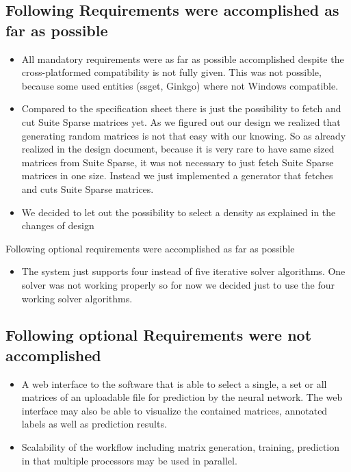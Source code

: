 \documentclass[parskip=full]{scrartcl}
\begin{document}
\subsection{Following Requirements were accomplished as far as possible}
\begin{itemize}

\item All mandatory requirements were as far as possible accomplished despite the cross-platformed compatibility is not fully given. 
This was not possible, because some used entities (\gls{ssget}, \gls{Ginkgo}) where not \gls{Windows} compatible.

\item Compared to the specification sheet there is just the possibility to fetch and cut \gls{Suite Sparse} matrices yet.
As we figured out our design we realized that generating random matrices is not that easy with our knowing.
So as already realized in the design document, because it is very rare to have same sized matrices from \gls{Suite Sparse}, it was not necessary to just fetch \gls{Suite Sparse} matrices in one size. 
Instead we just implemented a generator that fetches and cuts \gls{Suite Sparse} matrices.

\item We decided to let out the possibility to select a density as explained in the changes of design

\end{itemize}
Following optional requirements were accomplished as far as possible
\begin{itemize}
\item The system just supports four instead of five iterative solver \glspl{algorithm}.
One solver was not working properly so for now we decided just to use the four working solver \glspl{algorithm}.

\end{itemize}


\subsection{Following optional Requirements were not accomplished}
\begin{itemize}
\item A web interface to the software that is able to select a single, a set or all matrices of an uploadable file for prediction by the \gls{neural network}. 
The web interface may also be able to visualize the contained matrices, annotated labels as well as prediction results.

\item Scalability of the workflow including matrix generation, training, prediction in that multiple processors may be used in parallel.

\end{itemize}
\end{document}
